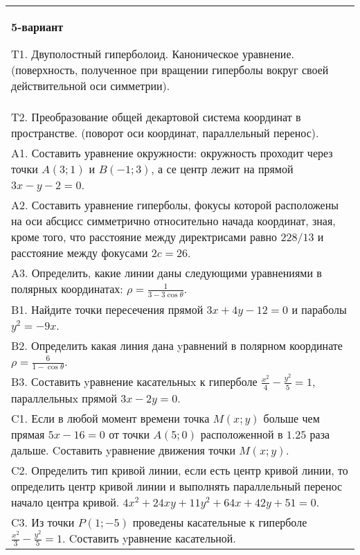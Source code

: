 \documentclass{article}
\begin{document}
\begin{tabular}{m{17cm}}
\textbf{5-вариант}
\newline

T1. Двуполостный гиперболоид. Каноническое уравнение. (поверхность, полученное при вращении гиперболы вокруг своей действительной оси симметрии).\\

T2. Преобразование общей декартовой система координат в пространстве. (поворот оси координат, параллельный перенос).\\

A1. Составить уравнение окружности: окружность проходит через точки $A(3;1)$ и $B(-1;3)$, а се центр лежит на прямой $3x-y-2=0$.\\

A2. Составить уравнение гиперболы, фокусы которой расположены на оси абсцисс симметрично относительно начада координат, зная, кроме того, что расстояние между директрисами равно $228/13$ и расстояние между фокусами $2c=26$.\\

A3. Определить, какие линии даны следующими уравнениями в полярных координатах: $\rho=\frac{1}{3-3\cos\theta}$.\\

B1. Найдите точки пересечения прямой $3x + 4y - 12 = 0$ и параболы $y^{2} = - 9x$.  \\

B2. Определить какая линия дана yравнений в полярном координате $\rho = \frac{6}{1 - \cos\theta}$.  \\

B3. Составить yравнение касательныx к гиперболе $\frac{x^{2}}{4} - \frac{y^{2}}{5} = 1$, параллельныx прямой $3x - 2y = 0$.  \\

C1. Если в любой момент времени точка $M(x;y)$ больше чем прямая $5x-16=0$ от точки $A(5;0)$ расположенной в $1.25$ раза дальше. Cоставить yравнение движения точки $M(x;y)$.  \\

C2. Определить тип кривой линии, если есть центр кривой линии, то определить центр кривой линии и выполнять параллельный перенос начало центра кривой. $4x^{2}+24xy+11y^{2}+64x+42y+51=0$.  \\

C3. Из точки $P(1;-5)$ проведены касательные к гиперболе $\frac{x^{2}}{3}-\frac{y^{2}}{5}=1$. Cоставить yравнение касательной.\\

\end{tabular}
\vspace{1cm}
\end{document}
